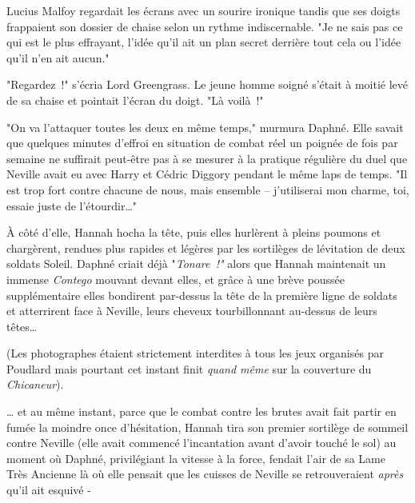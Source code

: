 Lucius Malfoy regardait les écrans avec un sourire ironique tandis que ses doigts frappaient son dossier de chaise selon un rythme indiscernable. "Je ne sais pas ce qui est le plus effrayant, l'idée qu'il ait un plan secret derrière tout cela ou l'idée qu'il n'en ait aucun."

"Regardez~!" s'écria Lord Greengrass. Le jeune homme soigné s'était à moitié levé de sa chaise et pointait l'écran du doigt. "Là voilà~!"

\later

"On va l'attaquer toutes les deux en même temps," murmura Daphné. Elle savait que quelques minutes d'effroi en situation de combat réel un poignée de fois par semaine ne suffirait peut-être pas à se mesurer à la pratique régulière du duel que Neville avait eu avec Harry et Cédric Diggory pendant le même laps de temps. "Il est trop fort contre chacune de nous, mais ensemble -- j'utiliserai mon charme, toi, essaie juste de l'étourdir…"

À côté d'elle, Hannah hocha la tête, puis elles hurlèrent à pleins poumons et chargèrent, rendues plus rapides et légères par les sortilèges de lévitation de deux soldats Soleil. Daphné criait déjà "\emph{Tonare~!"} alors que Hannah maintenait un immense \emph{Contego} mouvant devant elles, et grâce à une brève poussée supplémentaire elles bondirent par-dessus la tête de la première ligne de soldats et atterrirent face à Neville, leurs cheveux tourbillonnant au-dessus de leurs têtes…

(Les photographes étaient strictement interdites à tous les jeux organisés par Poudlard mais pourtant cet instant finit \emph{quand même} sur la couverture du \emph{Chicaneur}).

… et au même instant, parce que le combat contre les brutes avait fait partir en fumée la moindre once d'hésitation, Hannah tira son premier sortilège de sommeil contre Neville (elle avait commencé l'incantation avant d'avoir touché le sol) au moment où Daphné, privilégiant la vitesse à la force, fendait l'air de sa Lame Très Ancienne là où elle pensait que les cuisses de Neville se retrouveraient \emph{après} qu'il ait esquivé -

